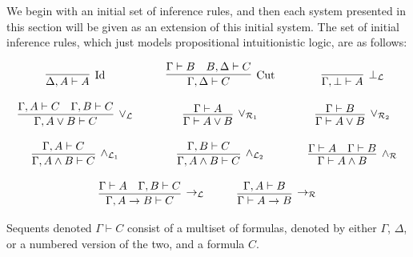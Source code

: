 \documentclass{article}
\begin{document}
We begin with an initial set of inference rules, and then each system
presented in this section will be given as an extension of this
initial system.  The set of initial inference rules, which just models
propositional intuitionistic logic, are as follows:
\begin{center}
  \small
  \begin{math}
    \begin{array}{c}
      \begin{array}{cccccccc}
        \infer[\text{Id}]{\Delta,A \vdash A}{
          \,
        }
        & \quad &
        \infer[\text{Cut}]{\Gamma,\Delta \vdash C}{
          \Gamma \vdash B
          &
          B,\Delta \vdash C
        }
        & \quad & 
        \infer[\perp_{\mathcal{L}}]{\Gamma,\perp \; \vdash A}{
          \,
        }\\\\
        \infer[\lor_{\mathcal{L}}]{\Gamma,A \lor B \vdash C}{
          \Gamma,A \vdash C
          &
          \Gamma,B \vdash C
        }
        & \quad &
        \infer[\lor_{\mathcal{R}_1}]{\Gamma \vdash A \lor B}{
          \Gamma \vdash A
        }
        & \quad &
        \infer[\lor_{\mathcal{R}_2}]{\Gamma \vdash A \lor B}{
          \Gamma \vdash B
        }\\\\
        \infer[\land_{\mathcal{L}_1}]{\Gamma,A \land B \vdash C}{
          \Gamma,A \vdash C
        }
        & \quad &
        \infer[\land_{\mathcal{L}_2}]{\Gamma,A \land B \vdash C}{
          \Gamma,B \vdash C
        }
        & \quad &
        \infer[\land_{\mathcal{R}}]{\Gamma \vdash A \land B}{
          \Gamma \vdash A
          &
          \Gamma \vdash B
        }\\\\
        
      \end{array}
      \\
      \begin{array}{cccccccc}
        \infer[\to_{\mathcal{L}}]{\Gamma,A \to B \vdash C}{
          \Gamma \vdash A
          &
          \Gamma,B \vdash C
        }
        & \quad &
        \infer[\to_{\mathcal{R}}]{\Gamma \vdash A \to B}{
          \Gamma, A \vdash B
        }
      \end{array}        
    \end{array}
  \end{math}
\end{center}
Sequents denoted $\Gamma \vdash C$ consist of a multiset of formulas,
denoted by either $\Gamma$, $\Delta$, or a numbered version of the
two, and a formula $C$.
\end{document}
